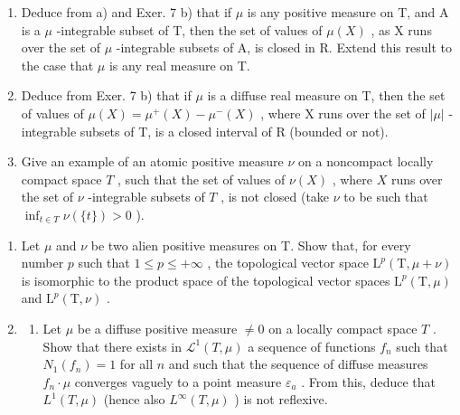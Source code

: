 \begin{enumerate}
\def\labelenumi{\alph{enumi})}
\setcounter{enumi}{1}
\item
  Deduce from a) and Exer. 7 b) that if \(\mu\) is any positive measure on T, and A is a \(\mu\) -integrable subset of T, then the set of values of \(\mu(X)\) , as X runs over the set of \(\mu\) -integrable subsets of A, is closed in R. Extend this result to the case that \(\mu\) is any real measure on T.
\item
  Deduce from Exer. 7 b) that if \(\mu\) is a diffuse real measure on T, then the set of values of \(\mu(X) = \mu^{+}(X) - \mu^{-}(X)\) , where X runs over the set of \(|\mu|\) -integrable subsets of T, is a closed interval of R (bounded or not).
\item
  Give an example of an atomic positive measure \(\nu\) on a noncompact locally compact space \(T\) , such that the set of values of \(\nu(X)\) , where \(X\) runs over the set of \(\nu\) -integrable subsets of \(T\) , is not closed (take \(\nu\) to be such that \(\inf_{t \in T} \nu(\{t\}) > 0\) ).
\end{enumerate}

\begin{enumerate}
\def\labelenumi{\arabic{enumi})}
\setcounter{enumi}{8}
\item
  Let \(\mu\) and \(\nu\) be two alien positive measures on T. Show that, for every number \(p\) such that \(1 \leqslant p \leqslant +\infty\) , the topological vector space \(\mathrm{L}^p(\mathrm{T}, \mu + \nu)\) is isomorphic to the product space of the topological vector spaces \(\mathrm{L}^p(\mathrm{T}, \mu)\) and \(\mathrm{L}^p(\mathrm{T}, \nu)\) .
\item
  \begin{enumerate}
  \def\labelenumii{\alph{enumii})}
  \tightlist
  \item
    Let \(\mu\) be a diffuse positive measure \(\neq 0\) on a locally compact space \(T\) . Show that there exists in \(\mathcal{L}^1(T, \mu)\) a sequence of functions \(f_n\) such that \(N_1(f_n) = 1\) for all \(n\) and such that the sequence of diffuse measures \(f_n \cdot \mu\) converges vaguely to a point measure \(\varepsilon_a\) . From this, deduce that \(L^1(T, \mu)\) (hence also \(L^\infty(T, \mu)\) ) is not reflexive.
  \end{enumerate}
\end{enumerate}

